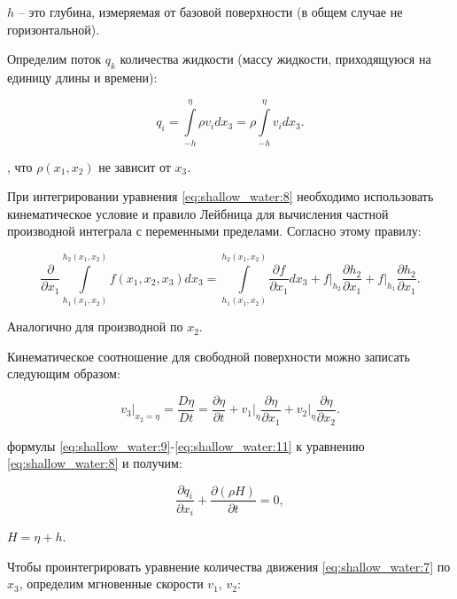 \documentclass[14pt]{extreport}
\begin{document}
 $h$ -- это глубина, измеряемая от базовой поверхности (в общем случае не горизонтальной).

Определим поток $q_k$ количества жидкости (массу жидкости, приходящуюся на единицу длины и времени):

\begin{equation}\label{eq:shallow_water:9}
q_i = \int\limits^\eta_{-h} \rho v_i dx_3 = \rho \int\limits^\eta_{-h} v_i dx_3.
\end{equation}

, что $\rho(x_1, x_2)$ не зависит от $x_3$.

При интегрировании уравнения \eqref{eq:shallow_water:8} необходимо использовать кинематическое условие и правило Лейбница \cite{bib:calc:zorich} для вычисления частной производной интеграла с переменными пределами. Согласно этому правилу:


\begin{equation}\label{eq:shallow_water:10}
\frac{\partial}{\partial x_1} \int\limits^{h_2(x_1,x_2)}_{h_1(x_1,x_2)} f(x_1, x_2, x_3) dx_3=\int\limits^{h_2(x_1,x_2)}_{h_1(x_1,x_2)} \frac{\partial f}{\partial x_1} dx_3 + f \bigg|_{h_2}  \frac{\partial h_2}{\partial x_1} + f \bigg|_{h_1} \frac{\partial h_2}{\partial x_1}.
\end{equation}

Аналогично для производной по $x_2$.

Кинематическое соотношение для свободной поверхности можно записать следующим образом:

\begin{equation}\label{eq:shallow_water:11}
v_3\bigg|_{x_2=\eta} = \frac{D\eta}{Dt} = \frac{\partial \eta}{\partial t} + v_1 \bigg|_{\eta} \frac{\partial \eta}{\partial x_1} + v_2 \bigg|_{\eta}\frac{\partial \eta}{\partial x_2}.
\end{equation}

 формулы \eqref{eq:shallow_water:9}-\eqref{eq:shallow_water:11} к уравнению \eqref{eq:shallow_water:8} и получим:

\begin{equation}\label{eq:shallow_water:12}
\frac{ \partial q_i}{\partial x_i} + \frac{\partial(\rho H)}{\partial t} = 0,
\end{equation}

 $H=\eta+h$.

Чтобы проинтегрировать уравнение количества движения \eqref{eq:shallow_water:7} по $x_3$, определим мгновенные скорости $v_1$, $v_2$:
\end{document}
